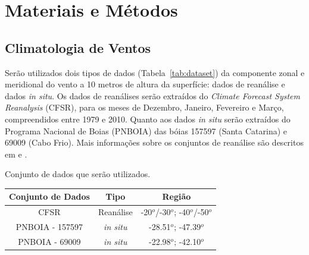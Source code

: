 \chapter{Materiais e Métodos}

\section{Climatologia de Ventos}
\label{sec:windClimatology}

\hspace{6mm} Serão utilizados dois tipos de dados (Tabela~\ref{tab:dataset}) da componente
zonal e meridional do vento a 10 metros de altura da superfície: dados de reanálise e
dados \textit{in situ}. Os dados de reanálises serão extraídos do \textit{Climate
Forecast System Reanalysis} (CFSR), para os meses de Dezembro, Janeiro, Fevereiro e
Março, compreendidos entre 1979 e 2010. Quanto aos dados \textit{in situ}
serão extraídos do Programa Nacional de Boias (PNBOIA) das bóias 157597 (Santa Catarina)
e 69009 (Cabo Frio). Mais informações sobre os conjuntos de reanálise são descritos em
\cite{Saha2010} e \cite{Berrisford2011}.

\bigskip
\begin{center}
\begin{tablehere}
\caption{Conjunto de dados que serão utilizados.}
\label{tab:dataset}
\begin{tabular}{|c|c|c|}

\hline
\textbf{Conjunto de Dados}                   & \textbf{Tipo}    & \textbf{Região}      \\ \hline
CFSR    & Reanálise        & -20$^o$/-30$^o$; -40$^o$/-50$^o$ \\ \hline
PNBOIA - 157597 & \textit{in situ} & -28.51$^o$; -47.39$^o$     \\ \hline
PNBOIA - 69009  & \textit{in situ} & -22.98$^o$; -42.10$^o$     \\ \hline
\end{tabular}
\end{tablehere}
\bigskip
\end{center}

